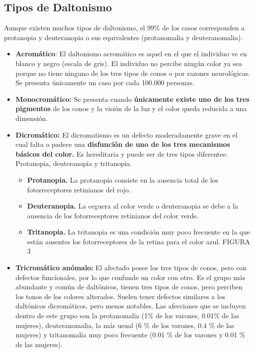 \documentclass[10pt]{article}
\begin{document}
\subsection{Tipos de Daltonismo}

Aunque existen muchos tipos de daltonismo, el 99\% de los casos corresponden a protanopia y deuteranopia o sus equivalentes (protanomalia y deuteranomalia).

\begin{itemize}
    \item \textbf{Acromático}: El daltonismo acromático es aquel en el que el individuo ve en blanco y negro (escala de gris). El individuo no percibe ningún color ya sea porque no tiene ninguno de los tres tipos de conos o por razones neurológicas. Se presenta únicamente un caso por cada 100.000 personas.
    \item \textbf{Monocromático:} Se presenta cuando \textbf{únicamente existe uno de los tres pigmentos} de los conos y la visión de la luz y el color queda reducida a una dimensión.
    \item \textbf{Dicromático:} El dicromatismo es un defecto moderadamente grave en el cual falta o padece una \textbf{disfunción de uno de los tres mecanismos básicos del color.} Es hereditaria y puede ser de tres tipos diferentes: Protanopia, deuteranopia y tritanopia.

    \begin{itemize}
        \item \textbf{Protanopia.} La protanopia consiste en la ausencia total de los fotorreceptores retinianos del rojo.
        \item \textbf{Deuteranopia.} La ceguera al color verde o deuteranopia se debe a la ausencia de los fotorreceptores retinianos del color verde.
        \item \textbf{Tritanopia.} La tritanopia es una condición muy poco frecuente en la que están ausentes los fotorreceptores de la retina para el color azul. FIGURA 3
    \end{itemize}
    \item \textbf{Tricromático anómalo: } El afectado posee los tres tipos de conos, pero con defectos funcionales, por lo que confunde un color con otro. Es el grupo más abundante y común de daltónicos, tienen tres tipos de conos, pero perciben los tonos de los colores alterados. Suelen tener defectos similares a los daltónicos dicromáticos, pero menos notables. Las afecciones que se incluyen dentro de este grupo son la protanomalia (1\% de los varones, 0.01\% de las mujeres), deuteranomalia, la más usual (6 \% de los varones, 0.4 \% de las mujeres) y tritanomalía muy poco frecuente (0.01 \% de los varones y 0.01 \% de las mujeres)\cite{IEEEreferencias:Ref31}.
\end{itemize}
\end{document}
